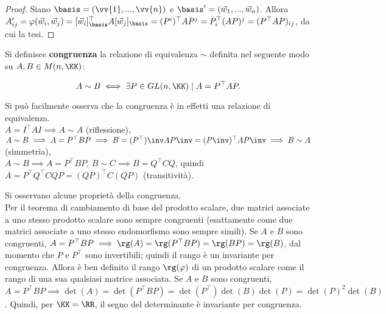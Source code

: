 \documentclass[11pt]{article}
\begin{document}
	\begin{proof} Siano $\basis = (\vv{1}, ..., \vv{n})$ e $\basis' = (\vec{w}_1, ..., \vec{w}_n)$. Allora
		$A'_{ij} = \varphi(\vec{w}_i, \vec{w}_j) = [\vec{w}_i]_{\basis}^\top A [\vec{w}_j]_{\basis} =
		(P^i)^\top A P^j = P_i^\top (AP)^j = (P^\top AP)_{ij}$, da cui la tesi.
	\end{proof}

	\begin{definition}
		Si definisce \textbf{congruenza} la relazione di equivalenza $\sim$ definita nel seguente
		modo su $A, B \in M(n, \KK)$:
		
		\[ A \sim B \iff \exists P \in GL(n, \KK) \mid A = P^\top A P. \]
	\end{definition}

	\begin{remark}
		Si può facilmente osserva che la congruenza è in effetti una relazione di equivalenza. \\
		
		\li $A = I^\top A I \implies A \sim A$ (riflessione), \\
		\li $A \sim B \implies A = P^\top B P \implies B = (P^\top)\inv A P\inv = (P\inv)^\top A P\inv \implies B \sim A$ (simmetria), \\
		\li $A \sim B \implies A = P^\top B P$, $B \sim C \implies B = Q^\top C Q$, quindi $A = P^\top Q^\top C Q P =
		(QP)^\top C (QP)$ (transitività). 
	\end{remark}

	\begin{remark}
		Si osservano alcune proprietà della congruenza. \\
		
		\li Per il teorema di cambiamento di base del prodotto scalare, due matrici associate a uno stesso
		prodotto scalare sono sempre congruenti (esattamente come due matrici associate a uno stesso
		endomorfismo sono sempre simili).
		\li Se $A$ e $B$ sono congruenti, $A = P^\top B P \implies \rg(A) = \rg(P^\top B P) = \rg(BP) = \rg(B)$,
		dal momento che $P$ e $P^\top$ sono invertibili; quindi il rango è un invariante per congruenza. Allora
		è ben definito il rango $\rg(\varphi)$ di un prodotto scalare come il rango di una sua qualsiasi matrice
		associata.
		\li Se $A$ e $B$ sono congruenti, $A = P^\top B P \implies \det(A) = \det(P^\top B P) = \det(P^\top) \det(B) \det(P)=
		\det(P)^2 \det(B)$. Quindi, per $\KK = \RR$, il segno del determinante è invariante per congruenza.
	\end{remark}
\end{document}
